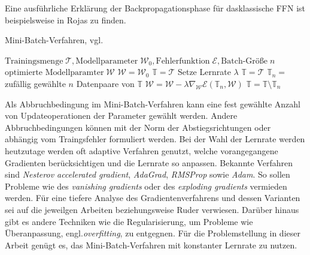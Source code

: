 Eine ausführliche Erklärung der Backpropagationsphase für dasklassische FFN ist beispielsweise in Rojas\cite{rojas96neural} zu finden.  

\begin{algorithm}
    \caption{Mini-Batch-Verfahren, vgl. \cite{gruening}}\label{alg:minibatch}
    \begin{algorithmic}
    \Require $ \text{Trainingsmenge} \; \mathcal{T}, \text{Modellparameter} \; \mathcal{W}_0, \text{Fehlerfunktion} \; \mathcal{E}, \text{Batch-Größe} \; n$
    \Ensure $\text{optimierte Modellparamter} \; \mathcal{W}$
    \State $\mathcal{W}=\mathcal{W}_0$
    \State $\mathbb{T}=\mathcal{T}$
    \State Setze Lernrate $\lambda$      
     
        \State $\mathbb{T}=\mathcal{T}$
    \EndIf
    \State $\mathbb{T}_n=$ zufällig gewählte $n$ Datenpaare von $\mathbb{T}$ 
    \State $\mathcal{W}=\mathcal{W}-\lambda \nabla_{\mathcal{W}} \mathcal{E}(\mathbb{T}_n,\mathcal{W})$
    \State $\mathbb{T}= \mathbb{T} \setminus \mathbb{T}_n$
    \EndWhile
    \end{algorithmic}
\end{algorithm}

Als Abbruchbedingung im Mini-Batch-Verfahren kann eine fest gewählte Anzahl von Updateoperationen der Parameter gewählt werden. Andere Abbruchbedingungen können mit der Norm der Abstiegsrichtungen\cite{bishop2006pattern} oder abhängig vom Traingsfehler formuliert werden. Bei der Wahl der Lernrate werden heutzutage werden oft adaptive Verfahren genutzt, welche vorangegangene Gradienten berücksichtigen und die Lernrate so anpassen. Bekannte Verfahren sind \textit{Nesterov accelerated
gradient}\cite{sutskever2013importance}, \textit{AdaGrad}\cite{duchi2011adaptive}, \textit{RMSProp}\cite{tieleman2012lecture} sowie \textit{Adam}\cite{Kingma2015AdamAM}. So sollen Probleme wie des \textit{vanishing gradients} oder des \textit{exploding gradients} vermieden werden\cite{hanin2018neural}.
Für eine tiefere Analyse des Gradientenverfahrens und dessen Varianten sei auf die jeweilgen Arbeiten beziehungsweise Ruder\cite{ruder2016overview,} verwiesen. Darüber hinaus gibt es andere Techniken wie die Regularisierung, um Probleme wie Überanpassung, engl.\textit{overfitting}, zu entgegnen.
Für die Problemstellung in dieser Arbeit genügt es, das Mini-Batch-Verfahren mit konstanter Lernrate zu nutzen. 



